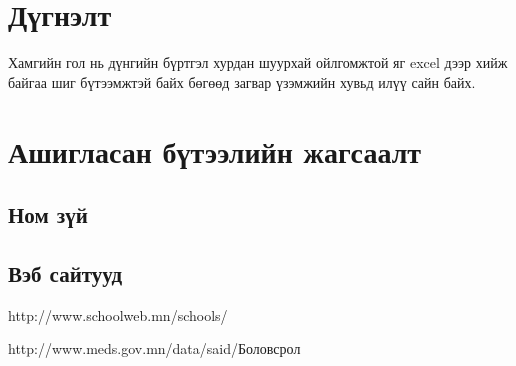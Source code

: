 \documentclass[
oneside, %
english, %
onehalfspacing, %
nolistspacing, %
headsepline, %
]{article} %
\begin{document}
     \section{Дүгнэлт}
     Хамгийн гол нь дүнгийн бүртгэл хурдан шуурхай ойлгомжтой яг excel дээр хийж байгаа шиг бүтээмжтэй байх бөгөөд загвар үзэмжийн хувьд илүү сайн байх.
    
     
     \section{Ашигласан бүтээлийн жагсаалт}
     \subsection{Ном зүй}
     \subsection{Вэб сайтууд}
     http://www.schoolweb.mn/schools/
     
     http://www.meds.gov.mn/data/said/Боловсрол%
     
\end{document}
